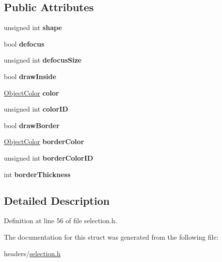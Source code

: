 \subsection*{Public Attributes}
\begin{DoxyCompactItemize}
\item 
\hypertarget{structCharacteristics_a5bbaeeb14e3a875db08ecea39ffcea54}{}unsigned int {\bfseries shape}\label{structCharacteristics_a5bbaeeb14e3a875db08ecea39ffcea54}

\item 
\hypertarget{structCharacteristics_a48faeb5b1352a5813fc99d29fe30a1f2}{}bool {\bfseries defocus}\label{structCharacteristics_a48faeb5b1352a5813fc99d29fe30a1f2}

\item 
\hypertarget{structCharacteristics_a7d761e46119e285da0bd826a4a6774ec}{}unsigned int {\bfseries defocus\+Size}\label{structCharacteristics_a7d761e46119e285da0bd826a4a6774ec}

\item 
\hypertarget{structCharacteristics_aad446cd74d72f5e734e70583acf261bd}{}bool {\bfseries draw\+Inside}\label{structCharacteristics_aad446cd74d72f5e734e70583acf261bd}

\item 
\hypertarget{structCharacteristics_a8f408d8583789749a2c9b4b55715303d}{}\hyperlink{structObjectColor}{Object\+Color} {\bfseries color}\label{structCharacteristics_a8f408d8583789749a2c9b4b55715303d}

\item 
\hypertarget{structCharacteristics_adef6271d166c73d67319450e2fc42d0e}{}unsigned int {\bfseries color\+I\+D}\label{structCharacteristics_adef6271d166c73d67319450e2fc42d0e}

\item 
\hypertarget{structCharacteristics_a02be9b757d42c816373e10e1ee6fa2dc}{}bool {\bfseries draw\+Border}\label{structCharacteristics_a02be9b757d42c816373e10e1ee6fa2dc}

\item 
\hypertarget{structCharacteristics_a4a3d1795f5ed670e4ac4fee1298efc33}{}\hyperlink{structObjectColor}{Object\+Color} {\bfseries border\+Color}\label{structCharacteristics_a4a3d1795f5ed670e4ac4fee1298efc33}

\item 
\hypertarget{structCharacteristics_a92d29fbdb8e4a4662723084fd18b1ee4}{}unsigned int {\bfseries border\+Color\+I\+D}\label{structCharacteristics_a92d29fbdb8e4a4662723084fd18b1ee4}

\item 
\hypertarget{structCharacteristics_a5c903831d39edbec3a3d1509b4070444}{}int {\bfseries border\+Thickness}\label{structCharacteristics_a5c903831d39edbec3a3d1509b4070444}

\end{DoxyCompactItemize}


\subsection{Detailed Description}


Definition at line 56 of file selection.\+h.



The documentation for this struct was generated from the following file\+:\begin{DoxyCompactItemize}
\item 
headers/\hyperlink{selection_8h}{selection.\+h}\end{DoxyCompactItemize}
